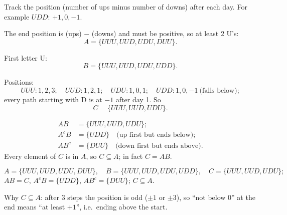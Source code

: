 \begin{solution}
	\idea Track the position (number of ups minus number of downs) after each
	day. For example $UDD$: $+1,0,-1$.

	 The end position is (ups) $-$ (downs) and must be positive, so
	at least 2 U's:
	\[ A=\{UUU,UUD,UDU,DUU\}. \]

	 First letter U:
	\[ B=\{UUU,UUD,UDU,UDD\}. \]

	 Positions:
	\[ UUU\colon 1,2,3;\quad UUD\colon 1,2,1;\quad UDU\colon 1,0,1;\quad
		UDD\colon 1,0,-1\ \text{(falls below)}; \]
	every path starting with D is at $-1$ after day 1. So
	\[ C=\{UUU,UUD,UDU\}. \]

	\[ \begin{aligned}
			AB   & =\{UUU,UUD,UDU\};                               \\
			A^cB & =\{UDD\}\quad\text{(up first but ends below)};   \\
			AB^c & =\{DUU\}\quad\text{(down first but ends above)}.
		\end{aligned} \]
	Every element of $C$ is in $A$, so $C\subseteq A$; in fact $C=AB$.
	\begin{answer}
		\[ A=\{UUU,UUD,UDU,DUU\},\quad B=\{UUU,UUD,UDU,UDD\},\quad
			C=\{UUU,UUD,UDU\}; \]
		$AB=C$, $A^cB=\{UDD\}$, $AB^c=\{DUU\}$; $C\subseteq A$.
	\end{answer}
	\begin{remark}
		Why $C\subseteq A$: after 3 steps the position is odd ($\pm1$ or $\pm3$),
		so ``not below 0'' at the end means ``at least $+1$'', i.e.\ ending above
		the start.
	\end{remark}
\end{solution}
